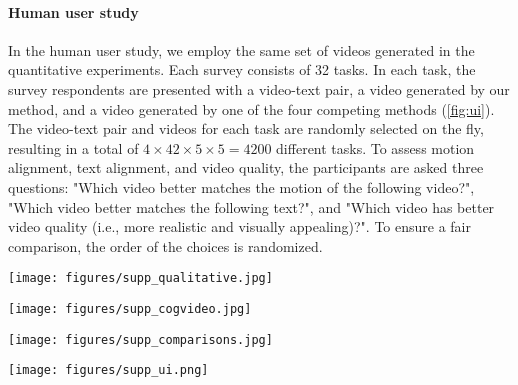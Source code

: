 \paragraph{Human user study}
In the human user study, we employ the same set of videos generated in the quantitative experiments. Each survey consists of 32 tasks. In each task, the survey respondents are presented with a video-text pair, a video generated by our method, and a video generated by one of the four competing methods (\cref{fig:ui}). The video-text pair and videos for each task are randomly selected on the fly, resulting in a total of $4\times 42\times 5\times 5=4200$ different tasks. To assess motion alignment, text alignment, and video quality, the participants are asked three questions: "Which video better matches the motion of the following video?", "Which video better matches the following text?", and "Which video has better video quality (i.e., more realistic and visually appealing)?". To ensure a fair comparison, the order of the choices is randomized.

\clearpage

\begin{figure*}
  \centering
  \texttt{[image: figures/supp\_qualitative.jpg]}
  \caption{{\bf Additional qualitative results.} The results demonstrate {\ours}'s capability to transfer both object movements and camera movements to new scenes.}
  \label{fig:supp_qualitative}
\end{figure*}

\clearpage

\begin{figure*}
  \centering
  \texttt{[image: figures/supp\_cogvideo.jpg]}
  \caption{{\bf More samples generated using CogVideoX~\cite{cogvideo} as the base model.} The results demonstrate the generality of {\ours}. Even with T2V diffusion models that employ full attentions, we can still extract cues for objects movement from attention weights computed between frames and cues for camera framing from attention weights computed between words and patch tokens.}
  \label{fig:cogvideo}
\end{figure*}

\clearpage

\begin{figure*}
  \centering
  \texttt{[image: figures/supp\_comparisons.jpg]}
  \caption{{\bf Additional qualitative comparisons.} The results demonstrate {\ours}'s superiority over existing motion customization methods in terms of video quality, text alignment, and motion alignment.}
  \label{fig:supp_comparisons}
\end{figure*}

\clearpage

\begin{figure*}
  \centering
  \texttt{[image: figures/supp\_ui.png]}
  \caption{{\bf User interface of an evaluation task.} Each task includes three questions, each assessing a key aspect of motion customization.}
  \label{fig:ui}
\end{figure*}


%     
%     
